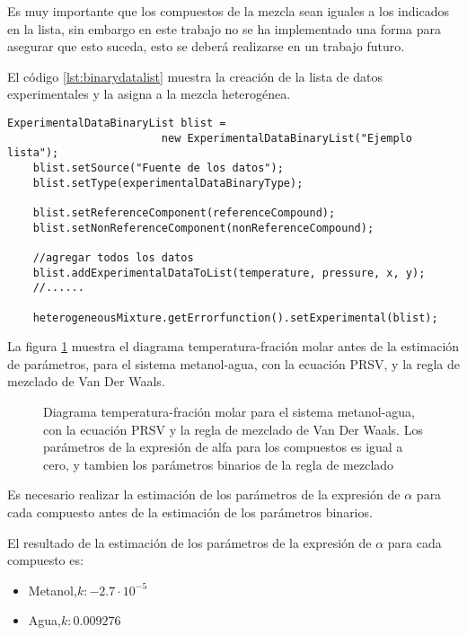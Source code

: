 	Es muy importante que los compuestos de la mezcla sean iguales a los indicados en la lista, sin embargo en este trabajo no se ha implementado una forma para asegurar que esto suceda, esto se deberá realizarse en un trabajo futuro.

	El código \ref{lst:binarydatalist} muestra la creación de la lista de datos experimentales y la asigna a la mezcla heterogénea.

\begin{lstlisting}[caption={Creación de la lista de datos experimentales y la asignación de esta a la mezcla heterogénea.},label={lst:binarydatalist}]
	ExperimentalDataBinaryList blist = 
						new ExperimentalDataBinaryList("Ejemplo lista");
	blist.setSource("Fuente de los datos");
	blist.setType(experimentalDataBinaryType);

	blist.setReferenceComponent(referenceCompound);
	blist.setNonReferenceComponent(nonReferenceCompound);

	//agregar todos los datos 
	blist.addExperimentalDataToList(temperature, pressure, x, y);
	//......

	heterogeneousMixture.getErrorfunction().setExperimental(blist);
\end{lstlisting}


	La figura \ref{fig:binarybefore} muestra el diagrama temperatura-fración molar antes de la estimación de parámetros, para el sistema metanol-agua, con la ecuación PRSV, y la regla de mezclado de Van Der Waals.

\begin{figure}[!h]
	\centering
	\caption{Diagrama temperatura-fración molar para el sistema metanol-agua, con la ecuación PRSV y la regla de mezclado de Van Der Waals. Los parámetros de la expresión de alfa para los compuestos es igual a cero, y tambien los parámetros binarios de la regla de mezclado}\label{fig:binarybefore}
\end{figure}

	Es necesario realizar la estimación de los parámetros de la expresión de $\alpha$ para cada compuesto antes de la estimación de los parámetros binarios.

	El resultado de la estimación de los parámetros de la expresión de $\alpha$ para cada compuesto es:
\begin{itemize}
	\item Metanol,$ k: -2.7 \cdot 10^{-5}$
	\item Agua,$ k: 0.009276$
\end{itemize}

